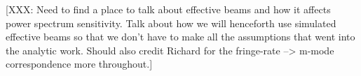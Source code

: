 \documentclass[twocolumn,apj,numberedappendix]{emulateapj}
\begin{document}
%
[XXX: Need to find a place to talk about effective beams and how it affects power spectrum sensitivity.  Talk about how we will henceforth use simulated effective beams so that we don't have to make all the assumptions that went into the analytic work.  Should also credit Richard for the fringe-rate --> m-mode correspondence more throughout.]
\end{document}
